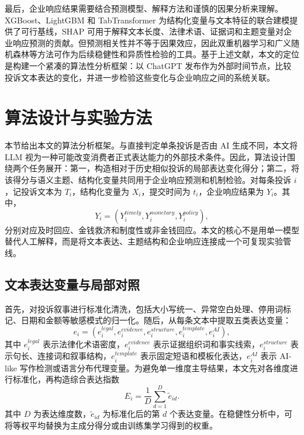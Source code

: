 \documentclass[UTF8]{ctexart}
\begin{document}
最后，企业响应结果需要结合预测模型、解释方法和谨慎的因果分析来理解。XGBoost、LightGBM 和 TabTransformer 为结构化变量与文本特征的联合建模提供了可行基线\cite{chen2016xgboost,ke2017lightgbm,huang2020tabtransformer}，SHAP 可用于解释文本长度、法律术语、证据词和主题变量对企业响应预测的贡献\cite{lundberg2017shap}。但预测相关性并不等于因果效应，因此双重机器学习和广义随机森林等方法可作为后续稳健性和异质性检验的工具\cite{chernozhukov2018dml,athey2019grf}。基于上述文献，本文的定位是构建一个紧凑的算法性分析框架：以 ChatGPT 发布作为外部时间节点，比较投诉文本表达的变化，并进一步检验这些变化与企业响应之间的系统关联。

\section{算法设计与实验方法}

本节给出本文的算法分析框架。与直接判定单条投诉是否由 AI 生成不同，本文将 LLM 视为一种可能改变消费者正式表达能力的外部技术条件。因此，算法设计围绕两个任务展开：第一，构造相对于历史相似投诉的局部表达变化得分；第二，将该得分与语义主题、结构化变量共同用于企业响应预测和机制检验。对每条投诉 \(i\)，记投诉文本为 \(T_i\)，结构化变量为 \(X_i\)，提交时间为 \(t_i\)，企业响应结果为 \(Y_i\)。其中，
\[
Y_i=(Y_i^{timely},Y_i^{monetary},Y_i^{policy}),
\]
分别对应及时回应、金钱救济和制度性或非金钱回应。本文的核心不是用单一模型替代人工解释，而是将文本表达、主题结构和企业响应连接成一个可复现实验管线。

\subsection{文本表达变量与局部对照}

首先，对投诉叙事进行标准化清洗，包括大小写统一、异常空白处理、停用词标记、日期和金额等敏感模式的归一化。随后，从每条文本中提取五类表达变量：
\[
e_i=(e_i^{legal},e_i^{evidence},e_i^{structure},e_i^{template},e_i^{AI}),
\]
其中 \(e_i^{legal}\) 表示法律化术语密度，\(e_i^{evidence}\) 表示证据组织词和事实线索，\(e_i^{structure}\) 表示句长、连接词和叙事结构，\(e_i^{template}\) 表示固定短语和模板化表达，\(e_i^{AI}\) 表示 AI-like 写作检测或语言分布代理变量。为避免单一维度主导结果，本文先对各维度进行标准化，再构造综合表达指数
\[
E_i=\frac{1}{D}\sum_{d=1}^{D}\widetilde e_{id}.
\]
其中 \(D\) 为表达维度数，\(\widetilde e_{id}\) 为标准化后的第 \(d\) 个表达变量。在稳健性分析中，可将等权平均替换为主成分得分或由训练集学习得到的权重。
\end{document}
